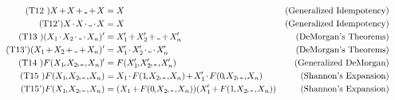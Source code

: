 \documentclass{minimal}
\renewcommand{\ldots}{\mathinner{.\mkern-3mu.\mkern-3mu.}}
\newcommand{\nplus}{\mathbin{\mkern-2mu+\mkern-2mu}}
\newcommand{\ntimes}{\mathbin{\mkern-2mu\cdot\mkern-2mu}}
\renewcommand{\not}[1]{#1^{\mkern-2mu\prime}}
\newcommand{\ncomma}{\mkern-2mu,\mkern-2mu}
\newcommand{\nargs}[1]{\mathinner{#1}}
\begin{document}
\begin{align*}
\tag{T12 } X\nplus X\nplus\ldots\nplus X &= X &\text{(Generalized Idempotency)} \\
\tag{T12'} X\ntimes X\ntimes\ldots\ntimes X &= X &\text{(Generalized Idempotency)} \\
\tag{T13 } (\nargs{X_1\ntimes X_2\ntimes\ldots\ntimes X_n})' &= \not{X_1} \nplus \not{X_2} \nplus \ldots \nplus \not{X_n} &\text{(DeMorgan's Theorems)} \\
\tag{T13'} (\nargs{X_1\nplus X_2\nplus\ldots\nplus X_n})' &= \not{X_1}\ntimes \not{X_2} \ntimes \ldots \ntimes \not{X_n} &\text{(DeMorgan's Theorems)} \\
\tag{T14 } \not{F(\nargs{X_1\ncomma X_2\ncomma\ldots\ncomma X_n})} &= F(\nargs{\not{X_1}\ncomma \not{X_2}\ncomma\ldots\ncomma \not{X_n}}) &\text{(Generalized DeMorgan)} \\
\tag{T15 } F(\nargs{X_1\ncomma X_2\ncomma\ldots\ncomma X_n}) &= X_1\ntimes F(\nargs{1\ncomma X_2\ncomma\ldots\ncomma X_n}) \nplus \not{X_1}\ntimes F(\nargs{0\ncomma X_2\ncomma\ldots\ncomma X_n}) &\text{(Shannon's Expansion)} \\
\tag{T15'} F(\nargs{X_1\ncomma X_2\ncomma\ldots\ncomma X_n}) &= (X_1 \nplus F(\nargs{0\ncomma X_2\ncomma\ldots\ncomma X_n}))( \not{X_1} \nplus F(\nargs{1\ncomma X_2\ncomma\ldots\ncomma X_n})) &\text{(Shannon's Expansion)}
\end{align*}
\end{document}
